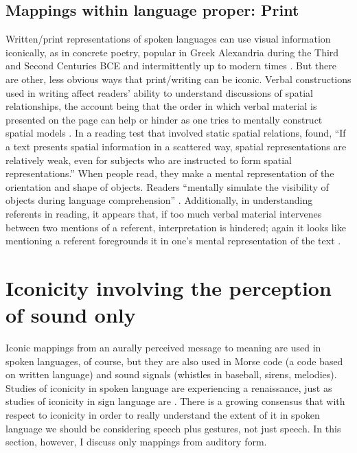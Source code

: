 \documentclass[output=paper,
modfonts
]{LSP/langsci}
\begin{document}
\subsection{Mappings within language proper: Print}

Written/print representations of spoken languages can use visual
information iconically, as in concrete poetry, popular in Greek
Alexandria during the Third and Second
Centuries BCE and intermittently up to modern times \citep{newell1976}. But
there are other, less obvious ways that print/writing can be iconic.
Verbal constructions used in writing affect readers' ability to
understand discussions of spatial relationships, the account being that
the order in which verbal material is presented on the page can help or
hinder as one tries to mentally construct spatial models \citep{moeser1976,morris1982,ehrlich1982,louwerse2008,zwaan2003}. In a reading test that involved static
spatial relations, \citet[119]{zwaan1993} found, ``If a text presents spatial
information in a scattered way, spatial representations are relatively
weak, even for subjects who are instructed to form spatial
representations.'' When people read, they make a mental representation
of the orientation \citep{stanfield2001} and shape \citep{zwaan2002} of objects. Readers ``mentally simulate the
visibility of objects during language comprehension'' \citep[229]{yaxley2007}. Additionally, in understanding referents in reading, it
appears that, if too much verbal material intervenes between two
mentions of a referent, interpretation is hindered; again it looks like
mentioning a referent foregrounds it in one's mental representation of
the text \citep{sanford1981}.

\section{Iconicity involving the perception of sound only}\label{sec:napoli:4}

Iconic mappings from an aurally perceived message to meaning are used in
spoken languages, of course, but they are also used in Morse code (a
code based on written language) and sound signals (whistles in baseball,
sirens, melodies). Studies of iconicity in spoken language are
experiencing a renaissance, just as studies of iconicity in sign
language are \citep{perniss2010}. There is a growing
consensus \citep{vigliocco2014,goldin2015} that with respect to iconicity in order to really
understand the extent of it in spoken language we should be considering
speech plus gestures, not just speech. In this section, however, I
discuss only mappings from auditory form.
\end{document}
